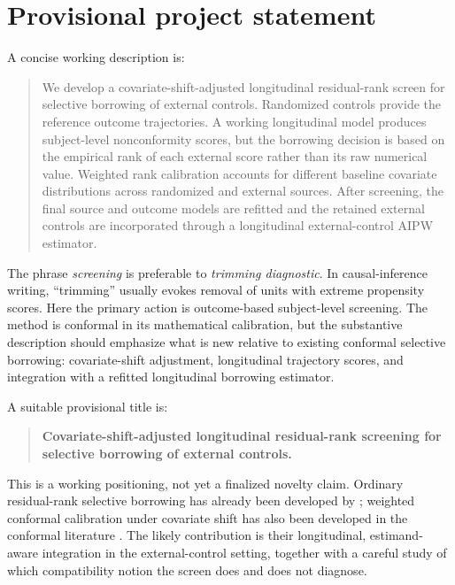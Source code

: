 \documentclass[11pt]{article}
\begin{document}
\setcounter{tocdepth}{2}
\tableofcontents
\newpage

\section{Provisional project statement}

A concise working description is:

\begin{quote}
We develop a covariate-shift-adjusted longitudinal residual-rank screen for selective borrowing of external controls. Randomized controls provide the reference outcome trajectories. A working longitudinal model produces subject-level nonconformity scores, but the borrowing decision is based on the empirical rank of each external score rather than its raw numerical value. Weighted rank calibration accounts for different baseline covariate distributions across randomized and external sources. After screening, the final source and outcome models are refitted and the retained external controls are incorporated through a longitudinal external-control AIPW estimator.
\end{quote}

The phrase \emph{screening} is preferable to \emph{trimming diagnostic}. In causal-inference writing, ``trimming'' usually evokes removal of units with extreme propensity scores. Here the primary action is outcome-based subject-level screening. The method is conformal in its mathematical calibration, but the substantive description should emphasize what is new relative to existing conformal selective borrowing: covariate-shift adjustment, longitudinal trajectory scores, and integration with a refitted longitudinal borrowing estimator.

A suitable provisional title is:

\begin{quote}
\textbf{Covariate-shift-adjusted longitudinal residual-rank screening for selective borrowing of external controls.}
\end{quote}

This is a working positioning, not yet a finalized novelty claim. Ordinary residual-rank selective borrowing has already been developed by \citet{zhu2025csb}; weighted conformal calibration under covariate shift has also been developed in the conformal literature \citep{tibshirani2019weighted,jin2026weighted}. The likely contribution is their longitudinal, estimand-aware integration in the external-control setting, together with a careful study of which compatibility notion the screen does and does not diagnose.
\end{document}
